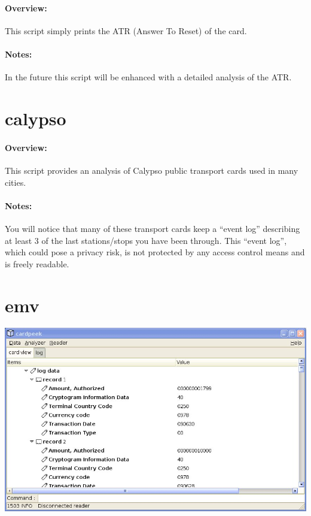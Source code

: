 \documentclass[11pt]{report}
\begin{document}
\paragraph{Overview:}
This script simply prints the ATR (Answer To Reset) of the card.

\paragraph{Notes:}
In the future this script will be enhanced with a detailed analysis of the ATR.

\section{calypso}

\paragraph{Overview:}
This script provides an analysis of Calypso public transport cards used in many cities.

\paragraph{Notes:}
You will notice that many of these transport cards keep a ``event log'' describing at least 3 of the last stations/stops you have been through.
This ``event log'', which could pose a privacy risk, is not protected by any access control means and is freely readable.

\section{emv}

\begin{center}
\includegraphics[width=.75\textwidth]{graphics/sample-emv.jpg}
\end{center}
\end{document}
